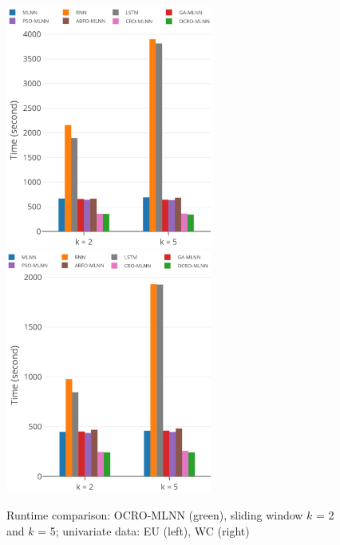 \documentclass[smallcondensed, natbib]{svjour3}     %
\begin{document}
{\begin{figure}
	\centering
	\begin{minipage}[t]{1.0\textwidth}
		\centering
		\includegraphics[width=0.45\textwidth =0cm 0cm 0cm 0cm, height = 8cm]{images/pdf/time/time_eu.pdf}
		\centering
		\includegraphics[width=0.45\textwidth =0cm 0cm 0cm 0cm, height = 8cm]{images/pdf/time/time_wc.pdf}
	\end{minipage}
	\caption{Runtime comparison: OCRO-MLNN (green), sliding window $k$ = 2 and $k$ = 5; univariate data: EU (left), WC (right)} 
	\label{fig:speed_system_univariate}
\end{figure}

}
\end{document}
